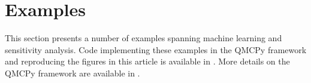\documentclass[graybox]{svmult}
\begin{document}
\section{Examples} \label{SoRa_sec:examples}

This section presents a number of examples spanning machine learning and sensitivity analysis. Code implementing these examples in the QMCPy framework and reproducing the figures in this article is available in \cite{vectorized_qmc_demo_notebook}. More details on the QMCPy framework are available in \cite{QMCSoftware}.

% 
\end{document}
